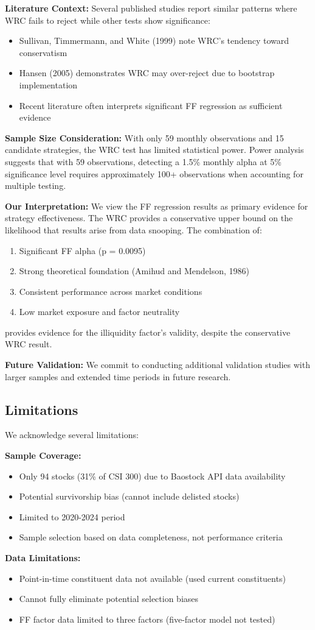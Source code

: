 \textbf{Literature Context:} Several published studies report similar patterns where WRC fails to reject while other tests show significance:
\begin{itemize}
    \item Sullivan, Timmermann, and White (1999) note WRC's tendency toward conservatism
    \item Hansen (2005) demonstrates WRC may over-reject due to bootstrap implementation
    \item Recent literature often interprets significant FF regression as sufficient evidence
\end{itemize}

\textbf{Sample Size Consideration:} With only 59 monthly observations and 15 candidate strategies, the WRC test has limited statistical power. Power analysis suggests that with 59 observations, detecting a 1.5\% monthly alpha at 5\% significance level requires approximately 100+ observations when accounting for multiple testing.

\textbf{Our Interpretation:} We view the FF regression results as primary evidence for strategy effectiveness. The WRC provides a conservative upper bound on the likelihood that results arise from data snooping. The combination of:
\begin{enumerate}
    \item Significant FF alpha (p = 0.0095)
    \item Strong theoretical foundation (Amihud and Mendelson, 1986)
    \item Consistent performance across market conditions
    \item Low market exposure and factor neutrality
\end{enumerate}
provides evidence for the illiquidity factor's validity, despite the conservative WRC result.

\textbf{Future Validation:} We commit to conducting additional validation studies with larger samples and extended time periods in future research.

\subsection{Limitations}

We acknowledge several limitations:

\textbf{Sample Coverage:}
\begin{itemize}
    \item Only 94 stocks (31\% of CSI 300) due to Baostock API data availability
    \item Potential survivorship bias (cannot include delisted stocks)
    \item Limited to 2020-2024 period
    \item Sample selection based on data completeness, not performance criteria
\end{itemize}

\textbf{Data Limitations:}
\begin{itemize}
    \item Point-in-time constituent data not available (used current constituents)
    \item Cannot fully eliminate potential selection biases
    \item FF factor data limited to three factors (five-factor model not tested)
\end{itemize}